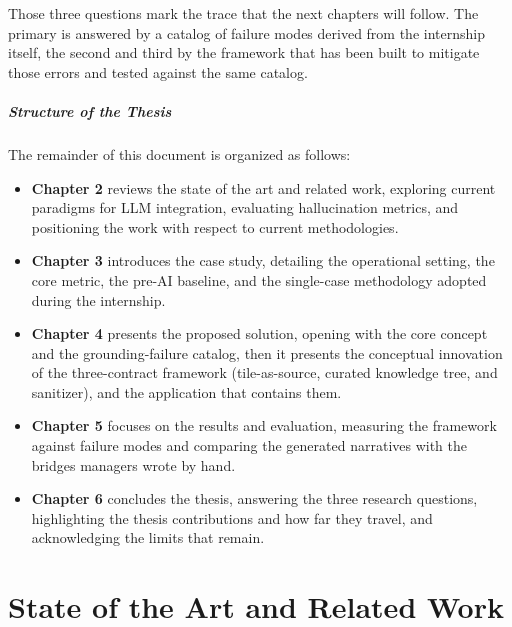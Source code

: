 \documentclass[12pt,a4paper,openright,twoside]{book}
\begin{document}
Those three questions mark the trace that the next chapters will follow. The primary is answered by a catalog of failure modes derived from the internship itself, the second and third by the framework that has been built to mitigate those errors and tested against the same catalog.

\paragraph{Structure of the Thesis}
The remainder of this document is organized as follows:

\begin{itemize}
    \item \textbf{Chapter 2} reviews the state of the art and related work, exploring current paradigms for \ac{LLM} integration, evaluating hallucination metrics, and positioning the work with respect to current methodologies.
    
    \item \textbf{Chapter 3} introduces the case study, detailing the operational setting, the core metric, the pre-AI baseline, and the single-case methodology adopted during the internship.
    
    \item \textbf{Chapter 4} presents the proposed solution, opening with the core concept and the grounding-failure catalog, then it presents the conceptual innovation of the three-contract framework (tile-as-source, curated knowledge tree, and sanitizer), and the application that contains them.
    
    \item \textbf{Chapter 5} focuses on the results and evaluation, measuring the framework against failure modes and comparing the generated narratives with the bridges managers wrote by hand.
    
    \item \textbf{Chapter 6} concludes the thesis, answering the three research questions, highlighting the thesis contributions and how far they travel, and acknowledging the limits that remain.
\end{itemize}

\chapter{State of the Art and Related Work}
\label{chap:state_of_the_art}
\end{document}
